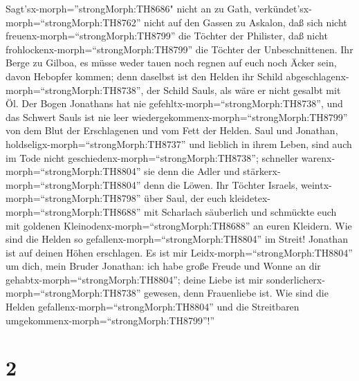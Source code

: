  Sagt'sx-morph=''strongMorph:TH8686" nicht an zu Gath,
verkündet'sx-morph=``strongMorph:TH8762'' nicht auf den Gassen zu
Askalon, daß sich nicht freuenx-morph=``strongMorph:TH8799'' die Töchter
der Philister, daß nicht frohlockenx-morph=``strongMorph:TH8799'' die
Töchter der Unbeschnittenen.  Ihr Berge zu Gilboa, es müsse
weder tauen noch regnen auf euch noch Äcker sein, davon Hebopfer kommen;
denn daselbst ist den Helden ihr Schild
abgeschlagenx-morph=``strongMorph:TH8738'', der Schild Sauls, als wäre
er nicht gesalbt mit Öl.  Der Bogen Jonathans hat nie
gefehltx-morph=``strongMorph:TH8738'', und das Schwert Sauls ist nie
leer wiedergekommenx-morph=``strongMorph:TH8799'' von dem Blut der
Erschlagenen und vom Fett der Helden.  Saul und Jonathan,
holdseligx-morph=``strongMorph:TH8737'' und lieblich in ihrem Leben,
sind auch im Tode nicht geschiedenx-morph=``strongMorph:TH8738'';
schneller warenx-morph=``strongMorph:TH8804'' sie denn die Adler und
stärkerx-morph=``strongMorph:TH8804'' denn die Löwen.  Ihr
Töchter Israels, weintx-morph=``strongMorph:TH8798'' über Saul, der euch
kleidetex-morph=``strongMorph:TH8688'' mit Scharlach säuberlich und
schmückte euch mit goldenen Kleinodenx-morph=``strongMorph:TH8688'' an
euren Kleidern.  Wie sind die Helden so
gefallenx-morph=``strongMorph:TH8804'' im Streit! Jonathan ist auf
deinen Höhen erschlagen.  Es ist mir
Leidx-morph=``strongMorph:TH8804'' um dich, mein Bruder Jonathan: ich
habe große Freude und Wonne an dir gehabtx-morph=``strongMorph:TH8804'';
deine Liebe ist mir sonderlicherx-morph=``strongMorph:TH8738'' gewesen,
denn Frauenliebe ist.  Wie sind die Helden
gefallenx-morph=``strongMorph:TH8804'' und die Streitbaren
umgekommenx-morph=``strongMorph:TH8799''!''

\hypertarget{section-1}{%
\section{2}\label{section-1}}

